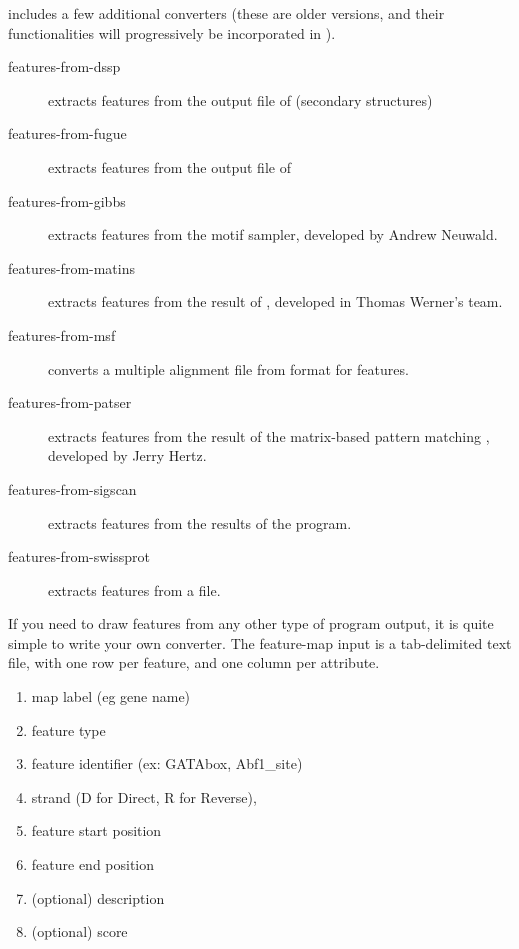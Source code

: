 \RSAT includes a few additional converters (these are older versions,
and their functionalities will progressively be incorporated in
).

\begin{description}

\item[features-from-dssp] extracts features from the output file of
 (secondary structures)

\item[features-from-fugue] extracts features from the output file of

\item[features-from-gibbs] extracts features from the  
motif sampler, developed by Andrew Neuwald. 

\item[features-from-matins] extracts features from the result of 
, developed in Thomas Werner's team. 

\item[features-from-msf] converts a multiple alignment file from 
format  for features. 

\item[features-from-patser] extracts features from the result of the 
matrix-based pattern matching , developed by Jerry Hertz. 

\item[features-from-sigscan] extracts features from the results of the
 program. 

\item[features-from-swissprot] extracts features from a  file. 

\end{description}


If you need to draw features from any other type of program 
output, it is quite simple to write your own converter. The feature-map 
input is a tab-delimited text file, with one row per feature, and 
one column per attribute. 

\begin{enumerate}
\item map label (eg gene name)
\item feature type
\item feature identifier (ex: GATAbox, Abf1\_site)
\item strand (D for Direct, R for Reverse),
\item feature start position
\item feature end position
\item (optional) description 
\item (optional) score
\end{enumerate}

